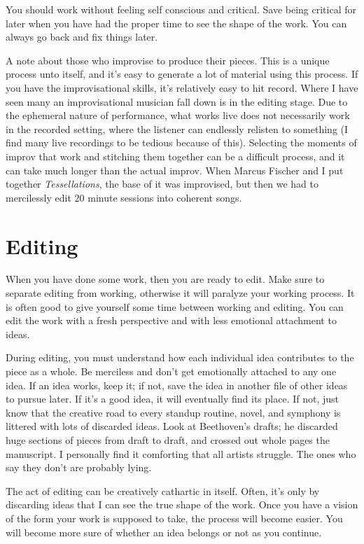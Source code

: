 \documentclass[
]{book}
\begin{document}
You should work without feeling self conscious and critical. Save being critical for later when you have had the proper time to see the shape of the work. You can always go back and fix things later.

A note about those who improvise to produce their pieces. This is a unique process unto itself, and it's easy to generate a lot of material using this process. If you have the improvisational skills, it's relatively easy to hit record. Where I have seen many an improvisational musician fall down is in the editing stage. Due to the ephemeral nature of performance, what works live does not necessarily work in the recorded setting, where the listener can endlessly relisten to something (I find many live recordings to be tedious because of this). Selecting the moments of improv that work and stitching them together can be a difficult process, and it can take much longer than the actual improv. When Marcus Fischer and I put together \emph{Tessellations}, the base of it was improvised, but then we had to mercilessly edit 20 minute sessions into coherent songs.

\hypertarget{editing}{%
\section{Editing}\label{editing}}

When you have done some work, then you are ready to edit. Make sure to separate editing from working, otherwise it will paralyze your working process. It is often good to give yourself some time between working and editing. You can edit the work with a fresh perspective and with less emotional attachment to ideas.

During editing, you must understand how each individual idea contributes to the piece as a whole. Be merciless and don't get emotionally attached to any one idea. If an idea works, keep it; if not, save the idea in another file of other ideas to pursue later. If it's a good idea, it will eventually find its place. If not, just know that the creative road to every standup routine, novel, and symphony is littered with lots of discarded ideas. Look at Beethoven's drafts; he discarded huge sections of pieces from draft to draft, and crossed out whole pages the manuscript. I personally find it comforting that all artists struggle. The ones who say they don't are probably lying.

The act of editing can be creatively cathartic in itself. Often, it's only by discarding ideas that I can see the true shape of the work. Once you have a vision of the form your work is supposed to take, the process will become easier. You will become more sure of whether an idea belongs or not as you continue.
\end{document}
